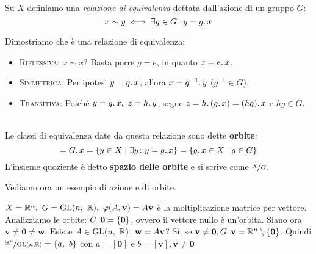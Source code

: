 \begin{define}~{}\\
	Su $X$ definiamo una \textit{relazione di equivalenza} dettata dall'azione di un gruppo $G$:
	\begin{equation*}
		x\sim y\iff \exists g\in G \colon y=g\ldotp x
	\end{equation*}
\vspace{-6mm}
\end{define}
\begin{demonstration}
	Dimostriamo che è una relazione di equivalenza:
	\begin{itemize}
		\item \textsc{Riflessiva}: $x\sim x?$ Basta porre $g=e$, in quanto $x=e\ldotp x$.
		\item \textsc{Simmetrica}: Per ipotesi $y=g\ldotp x$, allora $x=g^{-1}\ldotp y$ ($g^{-1}\in G$).
		\item \textsc{Transitiva}: Poiché $y=g\ldotp x,\ z=h\ldotp y$, segue $z=h\ldotp \left(g\ldotp x\right)=(hg)\ldotp x$ e $hg\in G$.
	\end{itemize}
\vspace{-3mm}
\end{demonstration}
\begin{define}[Orbita.]~{}\\
	Le classi di equivalenza date da questa relazione sono dette \textbf{orbite}:
		\begin{equation*}
			[x]=G\ldotp x=\{y\in X \mid \exists y \colon y=g\ldotp x\}=\{ g\ldotp x\in X\mid g\in G \}
		\end{equation*}
	L'insieme quoziente è detto \textbf{spazio delle orbite} e si scrive come $\nicefrac{X}{G}$.
\end{define}
Vediamo ora un esempio di azione e di orbite.
\begin{example}
	 $X=\realset^n,\ G=\gl(n,\ \realset), \ \phi(A,\mathbf{v})=A\mathbf{v}$ è la moltiplicazione matrice per vettore.\newline
		Analizziamo le orbite: $G\ldotp\mathbf{0}=\{\mathbf{0}\}$, ovvero il vettore nullo è un'orbita. Siano ora $\mathbf{v\neq 0\neq w}$. Esiste $A\in\operatorname{GL}(n,\ \mathbb{R}) \colon \mathbf{w}=A\mathbf{v}$? Sì, se $\mathbf{v\neq 0}, G\ldotp\mathbf{v}=\mathbb{R}^n\setminus\{\mathbf{0}\}$.
		Quindi $\nicefrac{\mathbb{R}^n}{\operatorname{GL}(n, \mathbb{R})}=\{ a,\ b\}$ con $a=[\mathbf{0}]$ e $b=[\mathbf{v}], \mathbf{v\neq 0}$
\end{example}
